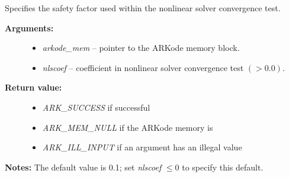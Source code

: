 \documentclass[letterpaper,10pt,english]{sphinxmanual}
\begin{document}
\begin{fulllineitems}
\label{c_interface/User_callable:c.ARKodeSetNonlinConvCoef}
Specifies the safety factor used within the nonlinear
solver convergence test.
\begin{description}
\item[{\textbf{Arguments:}}] \leavevmode\begin{itemize}
\item {} 
\emph{arkode\_mem} -- pointer to the ARKode memory block.

\item {} 
\emph{nlscoef} -- coefficient in nonlinear solver convergence test \((>0.0)\).

\end{itemize}

\item[{\textbf{Return value:}}] \leavevmode\begin{itemize}
\item {} 
\emph{ARK\_SUCCESS} if successful

\item {} 
\emph{ARK\_MEM\_NULL} if the ARKode memory is 

\item {} 
\emph{ARK\_ILL\_INPUT} if an argument has an illegal value

\end{itemize}

\end{description}

\textbf{Notes:} The default value is 0.1; set \emph{nlscoef} \(\le 0\)
to specify this default.

\end{fulllineitems}

\end{document}
